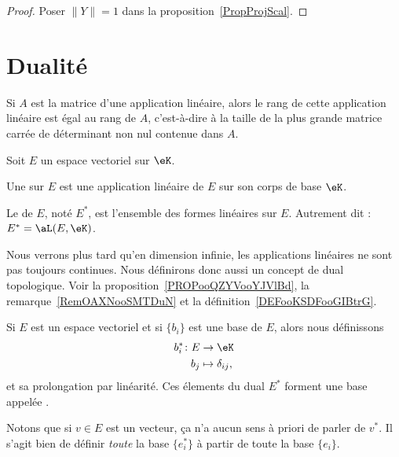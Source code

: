 \begin{proof}
	Poser \( \| Y \|=1\) dans la proposition~\ref{PropProjScal}.
\end{proof}

\section{Dualité}

\begin{proposition} \label{PropEJBZooTNFPRj}
	Si \( A\) est la matrice d'une application linéaire, alors le rang de cette application linéaire est égal au rang de \( A \), c'est-à-dire à la taille de la plus grande matrice carrée de déterminant non nul contenue dans \( A\).
\end{proposition}

\begin{definition}  \label{DefJPGSHpn}
	Soit \( E\) un espace vectoriel sur \( \eK\).

	Une  sur \( E \) est une application linéaire de \( E \) sur son corps de base \( \eK\).

	Le  de \( E\), noté \( E^*\), est l'ensemble des formes linéaires sur \( E\). Autrement dit : \( E^* = \aL(E,\eK)\).
\end{definition}

Nous verrons plus tard qu'en dimension infinie, les applications linéaires ne sont pas toujours continues. Nous définirons donc aussi un concept de dual topologique. Voir la proposition~\ref{PROPooQZYVooYJVlBd}, la remarque~\ref{RemOAXNooSMTDuN} et la définition~\ref{DEFooKSDFooGIBtrG}.

\begin{lemmaDef}      \label{DEFooTMSEooZFtsqa}
	Si \( E\) est un espace vectoriel et si \( \{ b_i \}\) est une base de \( E\), alors nous définissons
	\begin{equation}
		\begin{aligned}
			b_i^*\colon E & \to \eK               \\
			b_j         & \mapsto \delta_{ij},
		\end{aligned}
	\end{equation}
	et sa prolongation par linéarité. Ces élements du dual \( E^*\) forment une base appelée .
\end{lemmaDef}
Notons que si \( v\in E\) est un vecteur, ça n'a aucun sens à priori de parler de \( v^*\). Il s'agit bien de définir \emph{toute} la base \( \{ e_i^* \}\) à partir de toute la base \( \{ e_i \}\).

